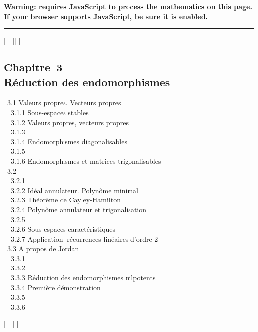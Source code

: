 \textbf{Warning: 
requires JavaScript to process the mathematics on this page.\\ If your
browser supports JavaScript, be sure it is enabled.}

\begin{center}\rule{3in}{0.4pt}\end{center}

{[}
{[}
{[}{]}
{[}

\subsection{Chapitre~3\\Réduction des endomorphismes}

~3.1 {Valeurs propres. Vecteurs
propres} \\ ~~3.1.1 {Sous-espaces
stables} \\ ~~3.1.2 {Valeurs
propres, vecteurs propres} \\ ~~3.1.3
 \\
~~3.1.4 {Endomorphismes
diagonalisables} \\ ~~3.1.5
 \\
~~3.1.6 {Endomorphismes et
matrices trigonalisables} \\ ~3.2
 \\
~~3.2.1  \\ ~~3.2.2
{Idéal annulateur. Polynôme
minimal} \\ ~~3.2.3 {Théorème de
Cayley-Hamilton} \\ ~~3.2.4
{Polynôme annulateur et
trigonalisation} \\ ~~3.2.5
 \\
~~3.2.6 {Sous-espaces
caractéristiques} \\ ~~3.2.7
{Application: récurrences
linéaires d'ordre 2} \\ ~3.3 {A
propos de Jordan} \\ ~~3.3.1
 \\
~~3.3.2  \\ ~~3.3.3
{Réduction des endomorphismes
nilpotents} \\ ~~3.3.4 {Première
démonstration} \\ ~~3.3.5
 \\
~~3.3.6 

{[}
{[}
{[}
{[}
